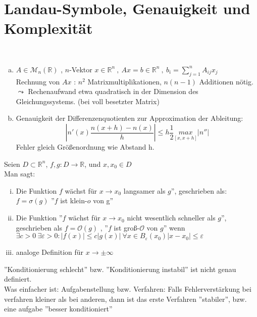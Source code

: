 \documentclass[../Skript.tex]{subfiles}
\begin{document}
\section{Landau-Symbole, Genauigkeit und Komplexität}
\begin{example}\hfill\\
\begin{enumerate}[(a)]
    \item $A\in\mathcal{M}_n(\mathbb{R})$ , $n$-Vektor $x\in\mathbb{R}^n \ , \ Ax=b\in\mathbb{R}^n \ , \ b_i=\sum_{j=1}^n A_{ij}x_j$\\
    Rechnung von $Ax$ : $n^2$ Matrixmultiplikationen, $n(n-1)$ Additionen nötig.
    $\leadsto$ Rechenaufwand etwa quadratisch in der Dimension des Gleichungssystems. (bei voll besetzter Matrix)

    \item Genauigkeit der Differenzenquotienten zur Approximation der Ableitung:
    $$\left|n'(x)\frac{n(x+h)-n(x)}{h}\right|\leq h\frac{1}{2}\underset{[x,x+h]}{max}|n''|$$ Fehler gleich Größenordnung wie Abstand h.
        
\end{enumerate}
\end{example}
\begin{definition}
    Seien $D\subset \mathbb{R}^n$, $f,g:D\to\mathbb{R}$, und $x,x_0\in D$\\
    Man sagt:
    \begin{enumerate}[i)]
        \item Die Funktion $f$ wächst für $x\to x_0$ langsamer als $g$'', geschrieben als: $f=\sigma(g)$ ''$f$ ist klein-$o$ von g''
        \item Die Funktion ''$f$ wächst für $x\to x_0$ nicht wesentlich schneller als $g$'', geschrieben als $f=\mathcal{O}(g)$ , ''$f$ ist groß-$\mathcal{O}$ von $g$''
        wenn $\exists c >0 \  \exists \varepsilon > 0: |f(x)| \leq c|g(x)| \ \forall x \in B_\varepsilon(x_0) |x-x_0|\leq \varepsilon$
        \item analoge Definition für $x\to \pm \infty$
    \end{enumerate}
\end{definition}

\begin{remark} ''Konditionierung schlecht'' bzw. ''Konditionierung instabil'' ist nicht genau definiert.\\ Was einfacher ist: Aufgabenstellung bzw. Verfahren: Falls Fehlerverstärkung bei verfahren kleiner als bei anderen, dann ist das erste Verfahren ''stabiler'', bzw. eine aufgabe ''besser konditioniert''
\end{remark}
\end{document}
